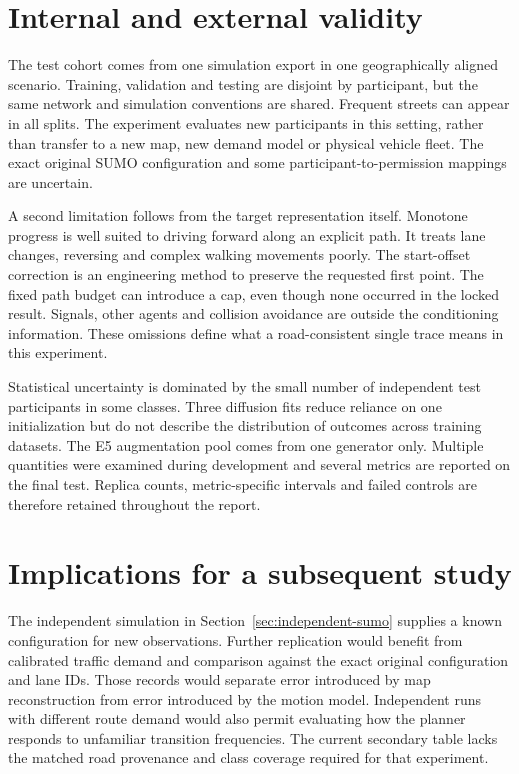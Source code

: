 \section{Internal and external validity}
The test cohort comes from one simulation export in one geographically aligned scenario. Training, validation and testing are disjoint by participant, but the same network and simulation conventions are shared. Frequent streets can appear in all splits. The experiment evaluates new participants in this setting, rather than transfer to a new map, new demand model or physical vehicle fleet. The exact original SUMO configuration and some participant-to-permission mappings are uncertain.

A second limitation follows from the target representation itself. Monotone progress is well suited to driving forward along an explicit path. It treats lane changes, reversing and complex walking movements poorly. The start-offset correction is an engineering method to preserve the requested first point. The fixed path budget can introduce a cap, even though none occurred in the locked result. Signals, other agents and collision avoidance are outside the conditioning information. These omissions define what a road-consistent single trace means in this experiment.

Statistical uncertainty is dominated by the small number of independent test participants in some classes. Three diffusion fits reduce reliance on one initialization but do not describe the distribution of outcomes across training datasets. The E5 augmentation pool comes from one generator only. Multiple quantities were examined during development and several metrics are reported on the final test. Replica counts, metric-specific intervals and failed controls are therefore retained throughout the report.

\section{Implications for a subsequent study}
The independent simulation in Section~\ref{sec:independent-sumo} supplies a known configuration for new observations. Further replication would benefit from calibrated traffic demand and comparison against the exact original configuration and lane IDs. Those records would separate error introduced by map reconstruction from error introduced by the motion model. Independent runs with different route demand would also permit evaluating how the planner responds to unfamiliar transition frequencies. The current secondary table lacks the matched road provenance and class coverage required for that experiment.

